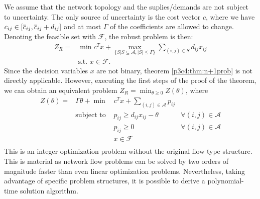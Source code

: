 We assume that the network topology and the suplies/demands are not subject to uncertainty. The only source of uncertainty is the cost vector $c$, where we have $c_{ij}\in[\overline{ c }_{ij},\overline{ c }_{ij}+d_{ij}]$ and at most $\Gamma$ of the coefficients are allowed to change. Denoting the feasible set with $\mathcal{F}$, the robust problem is then:
\begin{equation}\label{p3c4:solvedprob}
\begin{array}{rl}
Z_R = & \min c^Tx+\max\limits_{\{S\vert S\subseteq \mathcal{A},\vert S\vert\leq\Gamma\}}\sum\limits_{(i,j)\in S}d_{ij}x_{ij} \\
 & \text{s.t. } x\in \mathcal{F}.
\end{array}
\end{equation}
Since the decision variables $x$ are not binary, theorem \ref{p3c4:thm:n+1prob} is not directly applicable. However, executing the first steps of the proof of the theorem, we can obtain an equivalent problem $Z_R = \min_{\theta\geq0}Z(\theta)$, where
\begin{equation}\label{EQ:24}
\begin{array}{rclc}
Z(\theta )= & \Gamma\theta +\min & c^Tx+\sum\limits_{(i,j)\in \mathcal{A}}p_{ij} & \\
			& \text{subject to } & p_{ij}\geq d_{ij}x_{ij}-\theta & \forall (i,j)\in \mathcal{A} \\
			&					 & p_{ij}\geq 0					  & \forall (i,j)\in \mathcal{A} \\
			&					 & x\in \mathcal{F} & \\			
\end{array}
\end{equation}
This is an integer optimization problem without the original flow type structure. This is material as network flow problems can be solved by two orders of magnitude faster than even linear optimization problems. Nevertheless, taking advantage of specific problem structures, it is possible to derive a polynomial-time solution algorithm.

